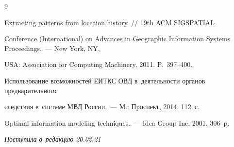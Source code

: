 {{\begin{thebibliography}{9}




 Extracting patterns from location history~/\!\!/  19th ACM SIGSPATIAL 


 Conference (International) on Advances in Geographic Information Systems Proceedings.~--- New York, NY, 


USA: Association for Computing Machinery, 2011. P.~397--400.






Использование возможностей ЕИТКС ОВД в~деятельности органов предварительного 


след\-ст\-вия в~сис\-те\-ме МВД России.~--- М.: Проспект, 2014. 112~с.






Optimal information modeling techniques.~--- Idea Group Inc, 2001. 306~p.


\end{thebibliography}


} }











\vspace*{-3pt}





\hfill{\small\textit{Поступила в~редакцию 20.02.21}}





\vspace*{6pt}















\newpage





\vspace*{-28pt}





